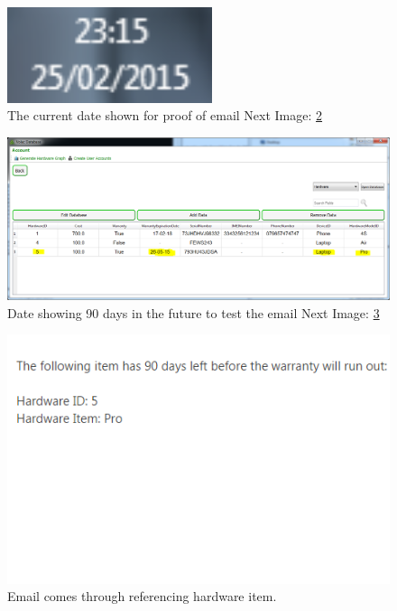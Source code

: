 \begin{figure}[H]
    \includegraphics[width=60mm,scale=0.5]{./Testing/Images/CurrentDate.png}
    \caption{The current date shown for proof of email Next Image: \ref{fig:HardwareDate}} \label{fig:CurrentDate}
\end{figure}

\begin{figure}[H]
    \includegraphics[width=\textwidth]{./Testing/Images/HardwareDate.png}
    \caption{Date showing 90 days in the future to test the email Next Image: \ref{fig:EmailExpiredHardware}} \label{fig:HardwareDate}
\end{figure}

\begin{figure}[H]
    \includegraphics[width=\textwidth]{./Testing/Images/EmailExpiredHardware.png}
    \caption{Email comes through referencing hardware item.} \label{fig:EmailExpiredHardware}
\end{figure}




